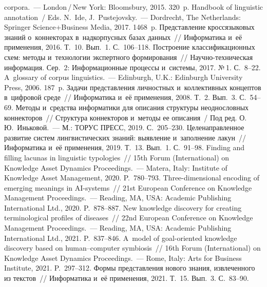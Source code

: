 \begin{multicols}{2}
{{\begin{thebibliography}{99}
corpora.~--- London\,/\,New York: Bloomsbury, 2015. 320~p.
Handbook of linguistic annotation~/ Eds. N.~Ide, J.~Pustejovsky.~--- Dordrecht, The 
Netherlands: Springer Science\;+\;Business Media, 2017. 1468~p.
 Представление 
кроссязыковых знаний о~коннекторах в~надкорпусных базах данных~// Информатика 
и~её применения, 2016. Т.~10. Вып.~1. 
С.~106--118.
 Построение классификационных 
схем: методы и~технологии экспертного формирования~// На\-уч\-но-тех\-ни\-че\-ская 
информация. Сер.~2: Информационные процессы и~сис\-те\-мы, 2017. №\,1. С.~8--22.
 A~glossary of corpus linguistics.~--- Edinburgh, 
U.K.: Edinburgh University Press, 2006. 187~p.
 Задачи представления 
личностных и~коллективных концептов в~циф\-ро\-вой среде~// Информатика и~её 
применения, 2008. Т.~2. Вып.~3. С.~54--69.
 Методы и~средства 
информатики для описания структуры неоднословных коннекторов~// Структура 
коннекторов и~методы ее описания~/ Под ред. О.\,Ю.~Иньковой.~--- М.: ТОРУС 
ПРЕСС, 2019. С.~205--230.
 Целенаправленное развитие систем лингвистических знаний: 
выявление и~заполнение лакун~// Информатика и~её применения, 2019. Т.~13. 
Вып.~1. С.~91--98.
 Finding and filling lacunas in linguistic typologies~// 15th  Forum (International) 
on Knowledge Asset Dynamics Proceedings.~--- Matera, Italy: Institute of Knowledge Asset 
Management, 2020. P.~780--793.
 Three-dimensional encoding of emerging meanings in AI-systems~// 21st 
European Conference on Knowledge Management Proceedings.~--- Reading, MA, USA: 
Academic Publishing International Ltd., 2020. P.~878--887.
 New knowledge discovery for creating terminological profiles 
of diseases~// 22nd European Conference on Knowledge Management Proceedings.~--- 
Reading, MA, USA: Academic Publishing International Ltd., 2021. P.~837--846.
 A~model of goal-oriented knowledge discovery based on human--computer 
symbiosis~// 16th Forum (International) on Knowledge Asset Dynamics Proceedings.~--- Rome, 
Italy: Arts for Business Institute, 2021. P.~297--312.
 Формы представления нового знания, извлеченного из текс\-тов~// 
Информатика и~её применения, 2021. Т.~15. Вып.~3. С.~83--90.
\end{thebibliography}

 }
 }

\end{multicols}

